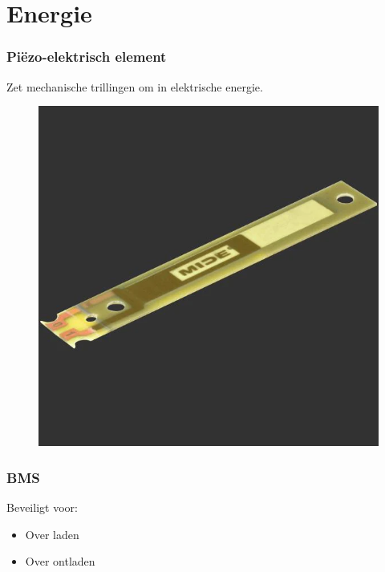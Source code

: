 \section{Energie}
    \begin{frame}
        \frametitle{Piëzo-elektrisch element}
    
        Zet mechanische trillingen om in elektrische energie.
        \begin{figure}[h]
            \raggedright
            \includegraphics[scale=0.2]{img/peizo.png}
        \end{figure}
        


    \end{frame}
    \begin{frame}
        \frametitle{BMS}
    
        Beveiligt voor:
        \begin{itemize}
            \item Over laden
            \item Over ontladen

            
        \end{itemize}
    
    \end{frame}
    
        
    
